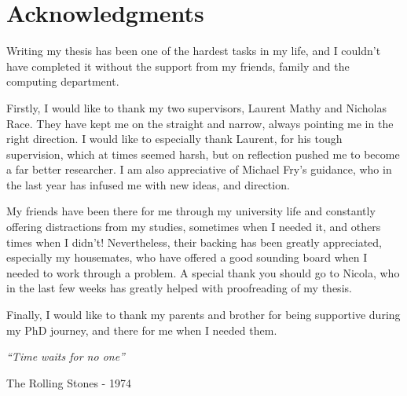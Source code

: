 \chapter{Acknowledgments}

Writing my thesis has been one of the hardest tasks in my life, and I couldn't have completed it without the support from my friends, family and the computing department. 

Firstly, I would like to thank my two supervisors, Laurent Mathy and Nicholas Race. They have kept me on the straight and narrow, always pointing me in the right direction. I would like to especially thank Laurent, for his tough supervision, which at times seemed harsh, but on reflection pushed me to become a far better researcher. I am also appreciative of Michael Fry's guidance, who in the last year has infused me with new ideas, and direction.

My friends have been there for me through my university life and constantly offering distractions from my studies, sometimes when I needed it, and others times when I didn't! Nevertheless, their backing has been greatly appreciated, especially my housemates, who have offered a good sounding board when I needed to work through a problem. A special thank you should go to Nicola, who in the last few weeks has greatly helped with proofreading of my thesis.

Finally, I would like to thank my parents and brother for being supportive during my PhD journey, and there for me when I needed them.





\singlespacing
\vspace*{1cm}
\begin{center}
    \it ``Time waits for no one'' \hspace*{0.5cm}
\end{center}
\begin{flushright}
    \small The Rolling Stones - 1974\hspace*{3cm}
\end{flushright}
\doublespacing

